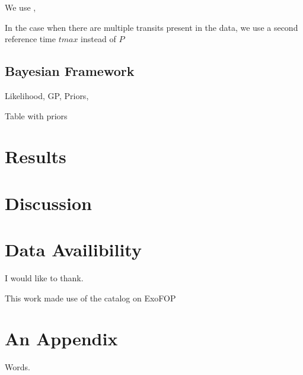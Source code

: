 \documentclass[modern]{aastex63}
\begin{document}
We use \exoplanet, \lightkurve


In the case when there are multiple transits present in the data, we use a second reference time $tmax$ instead of $P$



\subsection{Bayesian Framework}


Likelihood, GP, Priors, \celerite


Table with priors





\section{Results}

\section{Discussion}

\section{Data Availibility}



\acknowledgments

I would like to thank.



This work made use of the \tess catalog on ExoFOP

\vspace{5mm}


\appendix

\section{An Appendix}

Words.

{}

\end{document}
